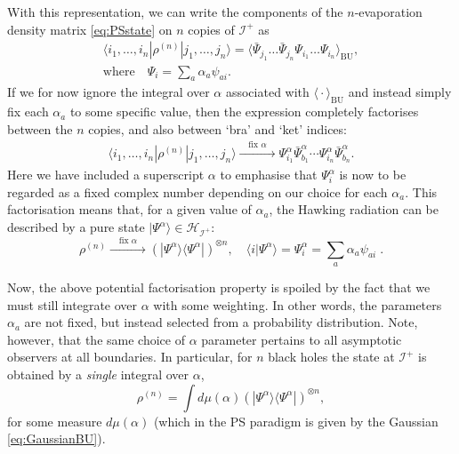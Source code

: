 \documentclass[letterpaper,12pt]{article}
\newcommand*{\hilb}{\mathcal{H}}	%
\newcommand*{\scri}{\mathscr{I}} %
\begin{document}
With this representation, we can write the components of the $n$-evaporation density matrix \eqref{eq:PSstate}  on $n$ copies of $\scri^+$ as
\begin{gather}
\label{eq:boundarycondtionamplitudes}
	\langle i_1,\ldots,i_n|\rho^{(n)}|j_1,\ldots,j_n\rangle = \Big\langle \bar{\Psi}_{j_1}\ldots \bar{\Psi}_{j_n} \Psi_{i_1}\ldots \Psi_{i_n} \Big\rangle_{\!\mathrm{BU}},\\
	\text{where}\quad \Psi_i = \sum_a \alpha_a\psi_{ai}.
\end{gather}
If we for now ignore the integral over $\alpha$ associated with $\big\langle \cdot \big\rangle_{\mathrm{BU}}$ and instead simply fix each $\alpha_a$ to some specific value, then the expression completely factorises between the $n$ copies, and also between `bra' and `ket' indices:
\begin{equation}
	\begin{gathered}
	\langle i_1,\ldots,i_n|\rho^{(n)}|j_1,\ldots,j_n\rangle \xrightarrow{\quad \text{fix }\alpha\quad} \Psi_{i_1}^\alpha \bar{\Psi}_{b_1}^\alpha \cdots \Psi_{i_n}^\alpha \bar{\Psi}_{b_n}^\alpha.
	\end{gathered}
\end{equation}
Here we have included a superscript $\alpha$ to emphasise that $\Psi^\alpha_i$ is now to be regarded as a fixed complex number depending on our choice for each $\alpha_a$. This factorisation means that, for a given value of $\alpha_a$, the Hawking radiation can be described by a pure state $|\Psi^{\alpha}\rangle\in\hilb_{\scri^+}$:
\begin{equation}
	\rho^{(n)} \xrightarrow{\quad \text{fix }\alpha\quad} (|\Psi^\alpha\rangle\langle\Psi^\alpha|)^{\otimes n}, \quad \langle i|\Psi^\alpha \rangle = \Psi_i^\alpha =  \sum_a{\alpha_a\psi_{ai}} \; .
\end{equation}

Now, the above potential factorisation property is spoiled by the fact that we must still integrate over $\alpha$ with some weighting. In other words, the parameters $\alpha_a$ are not fixed, but instead selected from a probability distribution. Note, however, that the same choice of $\alpha$ parameter pertains to all asymptotic observers at all boundaries. In particular, for $n$ black holes the state at $\scri^+$ is obtained by a {\it single} integral over $\alpha$,
\begin{equation}\label{eq:rhonalpha}
	\rho^{(n)} = \int d\mu(\alpha) \left(|\Psi^\alpha\rangle \langle \Psi^\alpha|\right)^{\otimes n},
\end{equation}
for some measure $d\mu(\alpha)$ (which in the PS paradigm is given by the Gaussian \eqref{eq:GaussianBU}).
\end{document}
